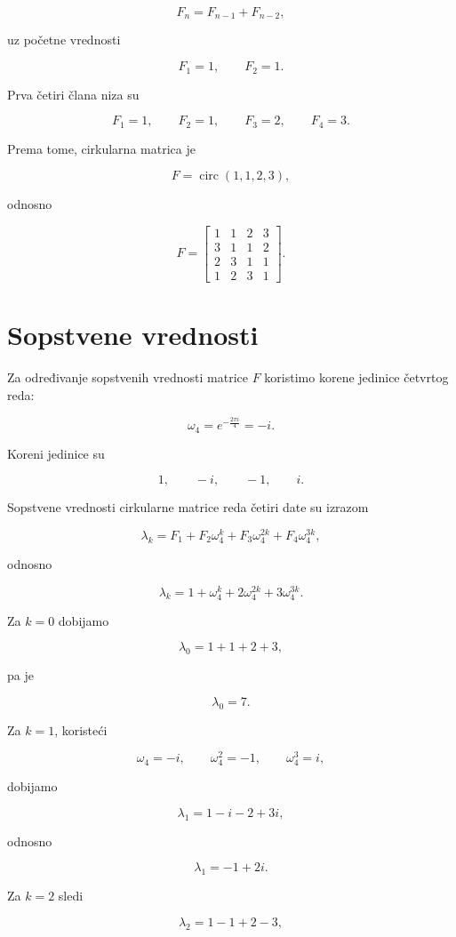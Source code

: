 \documentclass[12pt,a4paper]{report}
\begin{document}
\[
F_n=F_{n-1}+F_{n-2},
\]

uz početne vrednosti

\[
F_1=1,\qquad F_2=1.
\]

Prva četiri člana niza su

\[
F_1=1,\qquad F_2=1,\qquad
F_3=2,\qquad F_4=3.
\]

Prema tome, cirkularna matrica je

\[
F=\operatorname{circ}(1,1,2,3),
\]

odnosno

\[
F=
\begin{bmatrix}
	1 & 1 & 2 & 3\\
	3 & 1 & 1 & 2\\
	2 & 3 & 1 & 1\\
	1 & 2 & 3 & 1
\end{bmatrix}.
\]

\section{Sopstvene vrednosti}

Za određivanje sopstvenih vrednosti matrice \(F\) koristimo korene jedinice četvrtog reda:

\[
\omega_4=e^{-\frac{2\pi i}{4}}=-i.
\]

Koreni jedinice su

\[
1,\qquad -i,\qquad -1,\qquad i.
\]

Sopstvene vrednosti cirkularne matrice reda četiri date su izrazom

\[
\lambda_k=
F_1+F_2\omega_4^k+
F_3\omega_4^{2k}+
F_4\omega_4^{3k},
\]

odnosno

\[
\lambda_k=1+\omega_4^k+2\omega_4^{2k}
+3\omega_4^{3k}.
\]

Za \(k=0\) dobijamo

\[
\lambda_0=1+1+2+3,
\]

pa je

\[
\boxed{\lambda_0=7}.
\]

Za \(k=1\), koristeći

\[
\omega_4=-i,\qquad
\omega_4^2=-1,\qquad
\omega_4^3=i,
\]

dobijamo

\[
\lambda_1=1-i-2+3i,
\]

odnosno

\[
\boxed{\lambda_1=-1+2i}.
\]

Za \(k=2\) sledi

\[
\lambda_2=1-1+2-3,
\]
\end{document}
